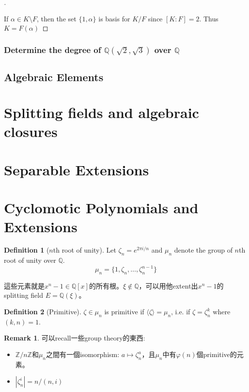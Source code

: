 \documentclass{article}
\theoremstyle{definition}
\newtheorem{dfn}{Definition}
\newtheorem{rem}{Remark}
\newenvironment{proofs}[1][\proofname]{%
  \begin{proof}[#1]$ $\par\nobreak\ignorespaces
}{%
  \end{proof}
}
\newcommand{\QQ}{\mathbb Q}
\newcommand{\ZZ}{\mathbb Z}
\begin{document}
\begin{proofs}
	If $\alpha\in K\setminus F$, then the set $\{1,\alpha\}$ is basis for $K/F$ since $[K:F]=2$. Thus $K=F(\alpha)$
\end{proofs}

\subsubsection*{Determine the degree of $\QQ(\sqrt{2},\sqrt{3})$ over $\QQ$}


\subsection{Algebraic Elements}

\section{Splitting fields and algebraic closures}

\section{Separable Extensions}

\section{Cyclomotic Polynomials and Extensions}

\begin{dfn}[$n$th root of unity]
	Let $\zeta_n=e^{2\pi i/n}$ and $\mu_n$ denote the group of $n$th root of unity over $\QQ$.
	\[\mu_n=\{1,\zeta_n,\dots,\zeta_n^{n-1}\}\]
\end{dfn}
這些元素就是$x^n-1\in\QQ[x]$的所有根。$\xi\notin\QQ$，可以用他extent出$x^n-1$的splitting field $E=\QQ(\xi)$。

\begin{dfn}[Primitive]
	$\zeta\in \mu_n$ is primitive if $\langle\zeta\rangle=\mu_n$, i.e. if $\zeta=\zeta_n^k$ where $(k,n)=1$.
\end{dfn}

\begin{rem}
	可以recall一些group theory的東西:
	\begin{itemize}
		\item $\ZZ/n\ZZ$和$\mu_n$之間有一個isomorphism: $a\mapsto \zeta_n^a$，且$\mu_n$中有$\varphi(n)$個primitive的元素。
		\item $|\zeta_n^i|=n/(n,i)$
	\end{itemize}
\end{rem}
\end{document}
